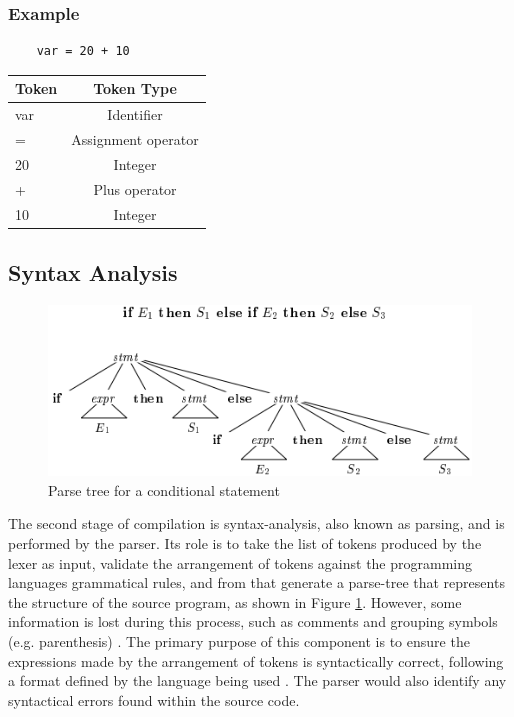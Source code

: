 \documentclass[
]{report}
\begin{document}
\subsubsection{Example}
\begin{verbatim}
	var = 20 + 10
\end{verbatim}
\begin{longtable}[l]{@{}lc@{}}
	\toprule
	Token & Token Type\tabularnewline
	\midrule
	\endhead
	var & Identifier\tabularnewline
	= & Assignment operator\tabularnewline
	20 & Integer\tabularnewline
	+ & Plus operator\tabularnewline
	10 & Integer\tabularnewline
	\bottomrule
\end{longtable}

\subsection{Syntax Analysis}
\begin{figure}
	\centering
	\includegraphics[width=\textwidth]{parse-tree}
	\caption{Parse tree for a conditional statement \cite{dragon-book}}
	\label{fig:parse-tree}
\end{figure}

The second stage of compilation is \gls{syntax-analysis}, also known as
\gls{parsing}, and is performed by the parser. Its role is to take the list of
\glspl{token} produced by the lexer as input, validate the arrangement of
\glspl{token} against the programming languages grammatical rules, and from
that generate a \gls{parse-tree} that represents the structure of the source
program, as shown in Figure \ref{fig:parse-tree}. However, some information
is lost during this process, such as comments and grouping symbols
(e.g. parenthesis) \cite{parsing-tools}. The primary purpose of this component
is to ensure the \glspl{expression} made by the arrangement of \glspl{token}
is syntactically correct, following a format defined by the language being
used \cite{tutorials-guide}. The parser would also identify any syntactical
errors found within the source code.
\end{document}

